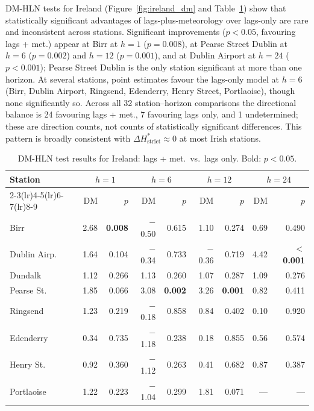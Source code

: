\documentclass[12pt,a4paper]{article}
\begin{document}
DM-HLN tests for Ireland (Figure~\ref{fig:ireland_dm} and
Table~\ref{tab:ireland_dm}) show that statistically significant advantages of
lags-plus-meteorology over lags-only are rare and inconsistent across stations.
Significant improvements ($p < 0.05$, favouring lags + met.) appear at Birr at
$h = 1$ ($p = 0.008$), at Pearse Street Dublin at $h = 6$ ($p = 0.002$) and
$h = 12$ ($p = 0.001$), and at Dublin Airport at $h = 24$ ($p < 0.001$); Pearse
Street Dublin is the only station significant at more than one horizon.  At
several stations, point estimates favour the lags-only model at $h = 6$ (Birr,
Dublin Airport, Ringsend, Edenderry, Henry Street, Portlaoise), though none
significantly so.  Across all 32 station--horizon comparisons the directional
balance is 24 favouring lags + met., 7 favouring lags only, and 1 undetermined;
these are direction counts, not counts of statistically significant differences.
This pattern is broadly consistent with $\Delta H^*_{\text{strict}} \approx 0$
at most Irish stations.

\begin{table}[htbp]
\centering
\caption{DM-HLN test results for Ireland: lags + met.\ vs.\ lags only.
  Bold: $p < 0.05$.}
\label{tab:ireland_dm}
\footnotesize
\begin{tabular}{lrrrrrrrr}
\toprule
Station &
\multicolumn{2}{c}{$h = 1$} &
\multicolumn{2}{c}{$h = 6$} &
\multicolumn{2}{c}{$h = 12$} &
\multicolumn{2}{c}{$h = 24$} \\
\cmidrule(lr){2-3}\cmidrule(lr){4-5}\cmidrule(lr){6-7}\cmidrule(lr){8-9}
& DM & $p$ & DM & $p$ & DM & $p$ & DM & $p$ \\
\midrule
Birr          &  2.68 & \textbf{0.008} & $-$0.50 & 0.615 &  1.10 & 0.274 & 0.69 & 0.490 \\
Dublin Airp.  &  1.64 & 0.104          & $-$0.34 & 0.733 & $-$0.36 & 0.719 & 4.42 & \textbf{$<$0.001} \\
Dundalk       &  1.12 & 0.266          &  1.13 & 0.260 &  1.07 & 0.287 & 1.09 & 0.276 \\
Pearse St.    &  1.85 & 0.066          &  3.08 & \textbf{0.002} & 3.26 & \textbf{0.001} & 0.82 & 0.411 \\
Ringsend      &  1.23 & 0.219          & $-$0.18 & 0.858 & 0.84 & 0.402 & 0.10 & 0.920 \\
Edenderry     &  0.34 & 0.735          & $-$1.18 & 0.238 & 0.18 & 0.855 & 0.56 & 0.574 \\
Henry St.     &  0.92 & 0.360          & $-$1.12 & 0.263 & 0.41 & 0.682 & 0.87 & 0.387 \\
Portlaoise    &  1.22 & 0.223          & $-$1.04 & 0.299 & 1.81 & 0.071 & --- & --- \\
\bottomrule
\end{tabular}
\end{table}
\end{document}
